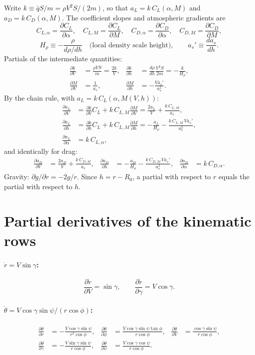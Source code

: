 \documentclass[11pt]{report}
\numberwithin{equation}{chapter}
\newcommand{\pd}[2]{\frac{\partial #1}{\partial #2}}
\newcommand{\aL}{a_L}
\newcommand{\aD}{a_D}
\begin{document}
Write $k \equiv \bar q S/m = \rho V^2 S/(2m)$, so that $\aL = k\,C_L(\alpha,M)$ and
$\aD = k\,C_D(\alpha,M)$. The coefficient slopes and atmospheric gradients are
\[
  C_{L,\alpha} = \pd{C_L}{\alpha},\quad C_{L,M} = \pd{C_L}{M},\quad
  C_{D,\alpha} = \pd{C_D}{\alpha},\quad C_{D,M} = \pd{C_D}{M},
\]
\[
  H_\rho \equiv -\frac{\rho}{d\rho/dh}\quad\text{(local density scale height)},\qquad
  a_s' \equiv \frac{d a_s}{dh} .
\]
Partials of the intermediate quantities:
\begin{align}
  \pd{k}{V} &= \frac{\rho V S}{m} = \frac{2k}{V}, &
  \pd{k}{h} &= \frac{d\rho}{dh}\frac{V^2S}{2m} = -\frac{k}{H_\rho}, \\
  \pd{M}{V} &= \frac{1}{a_s}, &
  \pd{M}{h} &= -\frac{V a_s'}{a_s^2} .
\end{align}
By the chain rule, with $\aL = k\,C_L(\alpha, M(V,h))$:
\begin{align}
  \pd{\aL}{V} &= \pd{k}{V}C_L + k\,C_{L,M}\pd{M}{V}
              = \frac{2\aL}{V} + \frac{k\,C_{L,M}}{a_s}, \label{eq:dLdV}\\
  \pd{\aL}{h} &= \pd{k}{h}C_L + k\,C_{L,M}\pd{M}{h}
              = -\frac{\aL}{H_\rho} - \frac{k\,C_{L,M}\,V a_s'}{a_s^2}, \label{eq:dLdh}\\
  \pd{\aL}{\alpha} &= k\,C_{L,\alpha}, \label{eq:dLda}
\end{align}
and identically for drag:
\begin{align}
  \pd{\aD}{V} &= \frac{2\aD}{V} + \frac{k\,C_{D,M}}{a_s}, &
  \pd{\aD}{h} &= -\frac{\aD}{H_\rho} - \frac{k\,C_{D,M}\,V a_s'}{a_s^2}, &
  \pd{\aD}{\alpha} &= k\,C_{D,\alpha} .
\end{align}
Gravity: $\partial g/\partial r = -2g/r$. Since $h = r - R_0$, a partial with respect to $r$
equals the partial with respect to $h$.

\section{Partial derivatives of the kinematic rows}

\paragraph{$\dot r = V\sin\gamma$:}
\[
  \pd{\dot r}{V} = \sin\gamma,\qquad \pd{\dot r}{\gamma} = V\cos\gamma .
\]
\paragraph{$\dot\theta = V\cos\gamma\sin\psi/(r\cos\phi)$:}
\begin{align*}
  \pd{\dot\theta}{r} &= -\frac{V\cos\gamma\sin\psi}{r^2\cos\phi}, &
  \pd{\dot\theta}{\phi} &= \frac{V\cos\gamma\sin\psi\tan\phi}{r\cos\phi}, &
  \pd{\dot\theta}{V} &= \frac{\cos\gamma\sin\psi}{r\cos\phi}, \\
  \pd{\dot\theta}{\gamma} &= -\frac{V\sin\gamma\sin\psi}{r\cos\phi}, &
  \pd{\dot\theta}{\psi} &= \frac{V\cos\gamma\cos\psi}{r\cos\phi} .
\end{align*}
\end{document}
